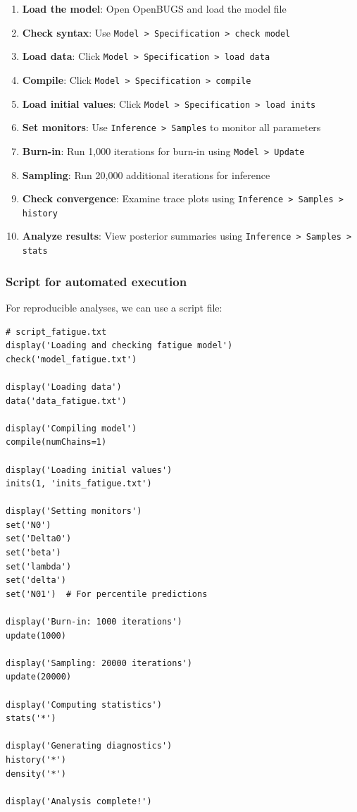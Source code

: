 \begin{enumerate}
\item \textbf{Load the model}: Open OpenBUGS and load the model file
\item \textbf{Check syntax}: Use \texttt{Model > Specification > check model}
\item \textbf{Load data}: Click \texttt{Model > Specification > load data}
\item \textbf{Compile}: Click \texttt{Model > Specification > compile}
\item \textbf{Load initial values}: Click \texttt{Model > Specification > load inits}
\item \textbf{Set monitors}: Use \texttt{Inference > Samples} to monitor all parameters
\item \textbf{Burn-in}: Run 1,000 iterations for burn-in using \texttt{Model > Update}
\item \textbf{Sampling}: Run 20,000 additional iterations for inference
\item \textbf{Check convergence}: Examine trace plots using \texttt{Inference > Samples > history}
\item \textbf{Analyze results}: View posterior summaries using \texttt{Inference > Samples > stats}
\end{enumerate}

\subsubsection*{Script for automated execution}

For reproducible analyses, we can use a script file:
\begin{codebox}
\begin{verbatim}
# script_fatigue.txt
display('Loading and checking fatigue model')
check('model_fatigue.txt')

display('Loading data')
data('data_fatigue.txt')

display('Compiling model')
compile(numChains=1)

display('Loading initial values')
inits(1, 'inits_fatigue.txt')

display('Setting monitors')
set('N0')
set('Delta0')
set('beta')
set('lambda')
set('delta')
set('N01')  # For percentile predictions

display('Burn-in: 1000 iterations')
update(1000)

display('Sampling: 20000 iterations')
update(20000)

display('Computing statistics')
stats('*')

display('Generating diagnostics')
history('*')
density('*')

display('Analysis complete!')
\end{verbatim}
\end{codebox}

